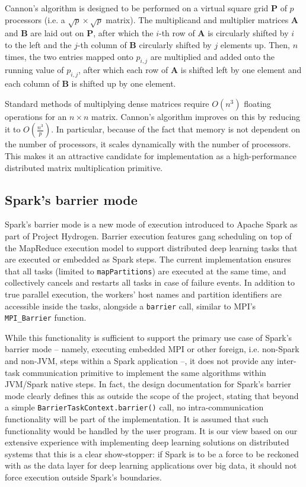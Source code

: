 \documentclass[bdcc,article,submit,moreauthors,pdftex]{Definitions/mdpi}
\begin{document}
Cannon's algorithm is designed to be performed on a virtual square grid $\mathbf{P}$ of $p$ processors (i.e. a $\sqrt{p} \times \sqrt{p}$ matrix). The multiplicand and multiplier matrices $\mathbf{A}$ and $\mathbf{B}$ are laid out on $\mathbf{P}$, after which the $i$-th row of $\mathbf{A}$ is circularly shifted by $i$ to the left and the $j$-th column of $\mathbf{B}$ circularly shifted by $j$ elements up. Then, $n$ times, the two entries mapped onto $p_{i, j}$ are multiplied and added onto the running value of $p_{i, j}$, after which each row of $\mathbf{A}$ is shifted left by one element and each column of $\mathbf{B}$ is shifted up by one element.

Standard methods of multiplying dense matrices require $O(n^3)$ floating operations for an $n \times n$ matrix. Cannon's algorithm improves on this by reducing it to $O(\frac{n^3}{p})$. In particular, because of the fact that memory is not dependent on the number of processors, it scales dynamically with the number of processors. This makes it an attractive candidate for implementation as a high-performance distributed matrix multiplication primitive.


\subsection{Spark's barrier mode} %
\label{sub:spark_s_barrier_mode}

Spark's barrier mode is a new mode of execution introduced to Apache Spark as part of Project Hydrogen.\cite{projecthydrogensite} Barrier execution features gang scheduling on top of the MapReduce execution model to support distributed deep learning tasks that are executed or embedded as Spark steps. The current implementation ensures that all tasks (limited to \texttt{mapPartitions}) are executed at the same time, and collectively cancels and restarts all tasks in case of failure events. In addition to true parallel execution, the workers' host names and partition identifiers are accessible inside the tasks, alongside a \texttt{barrier} call, similar to MPI's \texttt{MPI\_Barrier} function.\cite{projecthydrogenpres}

While this functionality is sufficient to support the primary use case of Spark's barrier mode -- namely, executing embedded MPI or other foreign, i.e. non-Spark and non-JVM, steps within a Spark application --, it does not provide any inter-task communication primitive to implement the same algorithms within JVM/Spark native steps. In fact, the design documentation for Spark's barrier mode clearly defines this as outside the scope of the project, stating that beyond a simple \texttt{BarrierTaskContext.barrier()} call, no intra-communication functionality will be part of the implementation. It is assumed that such functionality would be handled by the user program. It is our view based on our extensive experience with implementing deep learning solutions on distributed systems that this is a clear show-stopper: if Spark is to be a force to be reckoned with as the data layer for deep learning applications over big data, it should not force execution outside Spark's boundaries.
\end{document}
